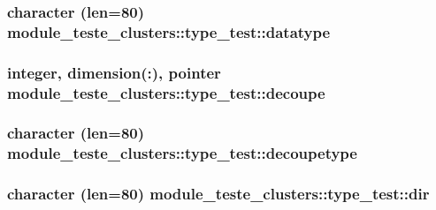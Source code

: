 \subsubsection[{datatype}]{\setlength{\rightskip}{0pt plus 5cm}character (len=80) module\+\_\+teste\+\_\+clusters\+::type\+\_\+test\+::datatype}\label{structmodule__teste__clusters_1_1type__test_a8b4d3aabaaea5f2881a91b6001928989}
\hypertarget{structmodule__teste__clusters_1_1type__test_a1eceed0de4bd5829751ba0a32b2d2eb4}{}
\subsubsection[{decoupe}]{\setlength{\rightskip}{0pt plus 5cm}integer, dimension(\+:), pointer module\+\_\+teste\+\_\+clusters\+::type\+\_\+test\+::decoupe}\label{structmodule__teste__clusters_1_1type__test_a1eceed0de4bd5829751ba0a32b2d2eb4}
\hypertarget{structmodule__teste__clusters_1_1type__test_abf7078230df53518aa75cf4c0e883230}{}
\subsubsection[{decoupetype}]{\setlength{\rightskip}{0pt plus 5cm}character (len=80) module\+\_\+teste\+\_\+clusters\+::type\+\_\+test\+::decoupetype}\label{structmodule__teste__clusters_1_1type__test_abf7078230df53518aa75cf4c0e883230}
\hypertarget{structmodule__teste__clusters_1_1type__test_a3f0c9892ac12f878cef715596063b6a0}{}
\subsubsection[{dir}]{\setlength{\rightskip}{0pt plus 5cm}character (len=80) module\+\_\+teste\+\_\+clusters\+::type\+\_\+test\+::dir}\label{structmodule__teste__clusters_1_1type__test_a3f0c9892ac12f878cef715596063b6a0}
\hypertarget{structmodule__teste__clusters_1_1type__test_a39ba4beaad65966bff6fd0b3897bf0bc}{}
